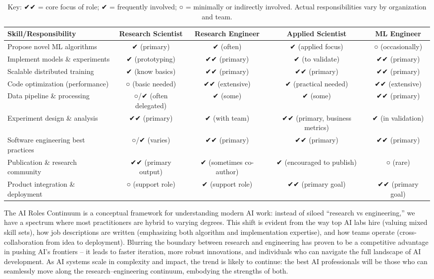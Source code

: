 \documentclass[pdflatex,sn-mathphys-num]{sn-jnl}%
\theoremstyle{thmstyleone}%
\theoremstyle{thmstyletwo}%
\theoremstyle{thmstylethree}%
\begin{document}
\begin{table}
\centering
\renewcommand{\arraystretch}{1.2} %
\begin{tabular}{p{4.5cm}cccc}
\hline
\textbf{Skill/Responsibility} & \textbf{Research Scientist} & \textbf{Research Engineer} & \textbf{Applied Scientist} & \textbf{ML Engineer} \\
\hline
Propose novel ML algorithms            & ✔ (primary)       & ✔ (often)        & ✔ (applied focus)   & ○ (occasionally)    \\
Implement models \& experiments        & ✔ (prototyping)   & ✔✔ (primary)     & ✔ (to validate)     & ✔✔ (primary)        \\
Scalable distributed training          & ✔ (know basics)   & ✔✔ (primary)     & ✔✔ (primary)        & ✔✔ (primary)        \\
Code optimization (performance)        & ○ (basic needed)  & ✔✔ (extensive)   & ✔ (practical needed)& ✔✔ (extensive)      \\
Data pipeline \& processing            & ○/✔ (often delegated) & ✔ (some)    & ✔ (some)           & ✔✔ (primary)        \\
Experiment design \& analysis          & ✔✔ (primary)      & ✔ (with team)    & ✔✔ (primary, business metrics) & ✔ (in validation)    \\
Software engineering best practices    & ○/✔ (varies)      & ✔✔ (primary)     & ✔✔ (primary)        & ✔✔ (primary)        \\
Publication \& research community      & ✔✔ (primary output) & ✔ (sometimes co-author) & ✔ (encouraged to publish) & ○ (rare)       \\
Product integration \& deployment      & ○ (support role)  & ✔ (support role) & ✔✔ (primary goal)   & ✔✔ (primary goal)   \\
\hline
\end{tabular}
\caption{Key: ✔✔ = core focus of role; ✔ = frequently involved; ○ = minimally or indirectly involved. Actual responsibilities vary by organization and team.}
\label{tab:roles_matrix}
\end{table}
 
The AI Roles Continuum is a conceptual framework for understanding modern AI work: instead of siloed “research vs engineering,” we have a spectrum where most practitioners are hybrid to varying degrees. This shift is evident from the way top AI labs hire (valuing mixed skill sets), how job descriptions are written (emphasizing both algorithm and implementation expertise), and how teams operate (cross-collaboration from idea to deployment). Blurring the boundary between research and engineering has proven to be a competitive advantage in pushing AI’s frontiers – it leads to faster iteration, more robust innovations, and individuals who can navigate the full landscape of AI development. As AI systems scale in complexity and impact, the trend is likely to continue: the best AI professionals will be those who can seamlessly move along the research–engineering continuum, embodying the strengths of both.
\end{document}
